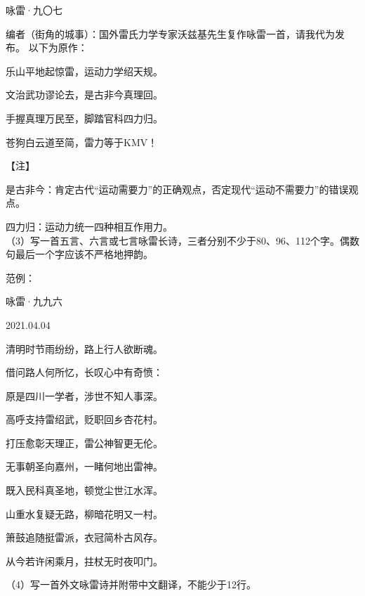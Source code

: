 \documentclass[UTF8,12pt,oneside]{ctexbook}
\begin{document}
    \begin{center}
        \large\kaishu
        咏雷·九〇七
        \songti\normalsize
    \end{center}
    \fangsong
    编者（街角的城事）：国外雷氏力学专家沃兹基先生复作咏雷一首，请我代为发布。
    以下为原作：
    \begin{center}
    乐山平地起惊雷，运动力学绍天规。
    
    文治武功谬论去，是古非今真理回。
    
    手握真理万民至，脚踏官科四力归。
    
    苍狗白云道至简，雷力等于KMV！
    
    \end{center}
    
    
    【注】
    
    是古非今：肯定古代“运动需要力”的正确观点，否定现代“运动不需要力”的错误观点。
    
    四力归：运动力统一四种相互作用力。
    \songti
    ~\\
    
    （3）写一首五言、六言或七言咏雷长诗，三者分别不少于80、96、112个字。偶数句最后一个字应该不严格地押韵。
    
    范例：
    
    \begin{center}
        \large\kaishu
        咏雷·九九六
        \songti\normalsize
        
        2021.04.04
    \end{center}
    \fangsong
    \begin{center}
    清明时节雨纷纷，路上行人欲断魂。
    
    借问路人何所忆，长叹心中有奇愤：
    
    原是四川一学者，涉世不知人事深。
    
    高呼支持雷绍武，贬职回乡杏花村。
    
    打压愈彰天理正，雷公神智更无伦。
    
    无事朝圣向嘉州，一睹何地出雷神。
    
    既入民科真圣地，顿觉尘世江水浑。
    
    山重水复疑无路，柳暗花明又一村。
    
    箫鼓追随挺雷派，衣冠简朴古风存。
    
    从今若许闲乘月，拄杖无时夜叩门。
    
    \end{center}
    \songti
    
    （4）写一首外文咏雷诗并附带中文翻译，不能少于12行。
    
\end{document}
